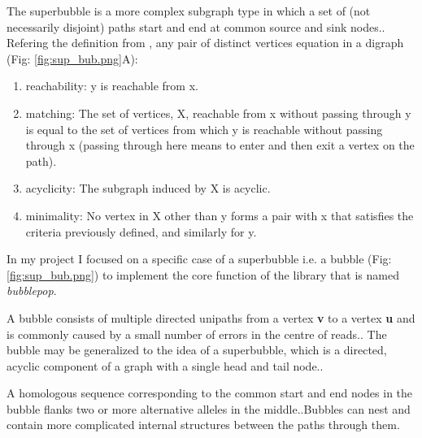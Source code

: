 
The superbubble is a more complex subgraph type in which a set of (not necessarily disjoint) paths start and end at common source and sink nodes.\cite{paten2018superbubbles}.
Refering the definition from \cite{onodera2013detecting}, any pair of distinct vertices equation in a digraph (Fig: \ref{fig:sup_bub.png}A):
\begin{enumerate}
\item reachability: y is reachable from x.

\item matching: The set of vertices, X, reachable from x without passing through y is equal to the set of vertices from which y is reachable without passing through x (passing through here means to enter and then exit a vertex on the path).

\item acyclicity: The subgraph induced by X is acyclic.

\item minimality: No vertex in X other than y forms a pair with x that satisfies the criteria previously defined, and similarly for y.


\end{enumerate}

In my project I focused on a specific case of a superbubble i.e. a bubble (Fig: \ref{fig:sup_bub.png}) to implement the core function of the library that is named \textit{bubblepop}. 

A bubble consists of multiple directed unipaths from a vertex\textbf{ v} to a vertex \textbf{u} and is commonly caused by a small number of errors in the centre of reads.\cite{brankovic2016linear}. The bubble may be generalized to the idea of a superbubble, which is a directed, acyclic component of a graph with a single head and tail node.\cite{onodera2013detecting}.

A homologous sequence corresponding to the common start
and end nodes in the bubble flanks two or more alternative alleles in the middle.\cite{garrison2019graphical}.Bubbles can nest and contain more complicated internal structures between the paths
through them. 

